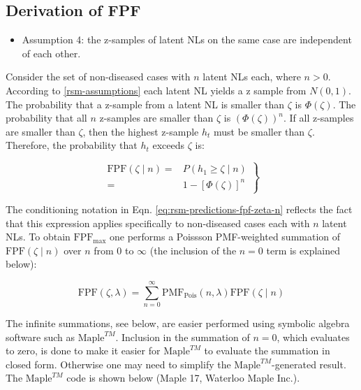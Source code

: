 \documentclass[
]{book}
\providecommand{\tightlist}{%
  \setlength{\itemsep}{0pt}\setlength{\parskip}{0pt}}
\begin{document}
\hypertarget{rsm-predictions-roc-curve-fpf}{%
\subsection{Derivation of FPF}\label{rsm-predictions-roc-curve-fpf}}

\begin{itemize}
\tightlist
\item
  Assumption 4: the z-samples of latent NLs on the same case are independent of each other.
\end{itemize}

Consider the set of non-diseased cases with \(n\) latent NLs each, where \(n > 0\). According to \ref{rsm-assumptions} each latent NL yields a z sample from \(N(0,1)\). The probability that a z-sample from a latent NL is smaller than \(\zeta\) is \(\Phi(\zeta)\). The probability that all \(n\) z-samples are smaller than \(\zeta\) is \((\Phi(\zeta))^n\). If all z-samples are smaller than \(\zeta\), then the highest z-sample \(h_t\) must be smaller than \(\zeta\). Therefore, the probability that \(h_t\) exceeds \(\zeta\) is:

\begin{equation}
\left. 
\begin{aligned}
\text{FPF}\left (\zeta \mid n \right ) =& P\left ( h_1 \geq  \zeta \mid n\right ) \\
=& 1 - \left [ \Phi\left ( \zeta \right )  \right ]^n
\end{aligned}
\right \}
\label{eq:rsm-predictions-fpf-zeta-n}
\end{equation}

The conditioning notation in Eqn. \eqref{eq:rsm-predictions-fpf-zeta-n} reflects the fact that this expression applies specifically to non-diseased cases each with \(n\) latent NLs. To obtain \(\text{FPF}_{\text{max}}\) one performs a Poissson PMF-weighted summation of \(\text{FPF}\left (\zeta \mid n \right )\) over \(n\) from 0 to \(\infty\) (the inclusion of the \(n = 0\) term is explained below):

\begin{equation}
\text{FPF}\left (\zeta, \lambda \right ) = \sum_{n=0}^{\infty} \text{PMF}_{\text{Pois}} \left ( n, \lambda \right )\text{FPF}\left (\zeta \mid n \right )
\label{eq:rsm-predictions-fpf-zeta-before-maple}
\end{equation}

The infinite summations, see below, are easier performed using symbolic algebra software such as \(\text{Maple}^{TM}\). Inclusion in the summation of \(n = 0\), which evaluates to zero, is done to make it easier for \(\text{Maple}^{TM}\) to evaluate the summation in closed form. Otherwise one may need to simplify the \(\text{Maple}^{TM}\)-generated result. The \(\text{Maple}^{TM}\) code is shown below (Maple 17, Waterloo Maple Inc.).
\end{document}
